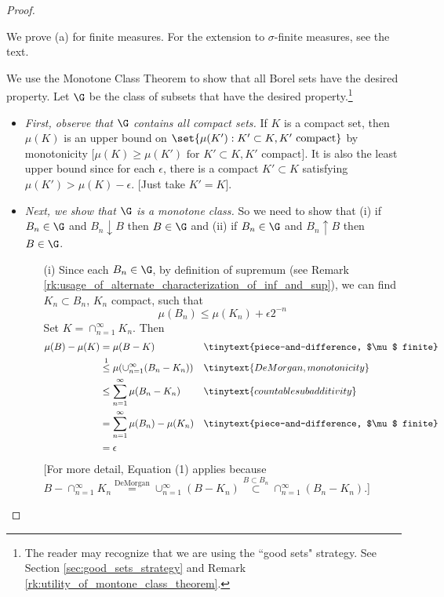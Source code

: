 \documentclass{article} %
\begin{document}
\begin{proof}
\;
\begin{alphabate}
\item We prove (a) for finite measures.   For the extension to $\sigma$-finite measures, see the text.  

We use the Monotone Class Theorem to show that all Borel sets have the desired property. Let $\G$ be the class of subsets that have the desired property.\footnote{The reader may recognize that we are using the ``good sets" strategy.  See Section \ref{sec:good_sets_strategy} and Remark \ref{rk:utility_of_montone_class_theorem}.} 
	\begin{itemize}
	\item \textit{First, observe that $\G$ contains all compact sets.}  If $K$ is a compact set, then $\mu(K)$ is an upper bound on $\set{\mu(K') : K' \subset K, K' \text{ compact}}$ by monotonicity {\footnotesize [$\mu(K) \geq \mu(K') \text{ for } K' \subset K,  K' \text{ compact}$].}  It is also the least upper bound since for each $\epsilon$, there is a compact $K' \subset K$ satisfying $\mu(K') > \mu(K) - \epsilon$. {\footnotesize [Just take $K'=K$].}  
	\item \textit{Next, we show that $\G$ is a monotone class.}  So we need to show that (i) if $B_n \in \G$ and $B_n \downarrow B$ then $B \in \G$ and (ii) if $B_n \in \G$ and $B_n \uparrow B$ then $B \in \G$.  
		\begin{itemize}
		\item[(i)] Since each $B_n \in \G$, by definition of supremum (see Remark \ref{rk:usage_of_alternate_characterization_of_inf_and_sup}), we can find $K_n \subset B_n$, $K_n$ compact, such that 
		\[\mu(B_n) \leq \mu(K_n) + \epsilon 2^{-n}\]
		Set $K=\cap_{n=1}^\infty K_n$.   Then
		\begin{align*}
		\mu(B) - \mu(K) &= \mu(B-K) && \tinytext{piece-and-difference, $\mu$ finite} \\
		&\stackrel{1}{\leq} \mu(\cup_{n=1}^\infty (B_n-K_n)) && \tinytext{DeMorgan, monotonicity}\\
		&\leq \sum_{n=1}^\infty \mu(B_n - K_n) && \tinytext{countable subadditivity} \\
		&= 	\sum_{n=1}^\infty \mu(B_n) - \mu(K_n) && \tinytext{piece-and-difference, $\mu$ finite} \\
		&= \epsilon 
		\end{align*}
		{\footnotesize [For more detail, Equation (1) applies because $B - \cap_{n=1}^\infty K_n \stackrel{\text{DeMorgan}}{=} \cup_{n=1}^\infty (B-K_n) \stackrel{B \subset B_n}{\subset} \cap_{n=1}^\infty (B_n - K_n)$.]} \\
		

\end{itemize}
\end{itemize}
\end{alphabate}
\end{proof}
\end{document}

